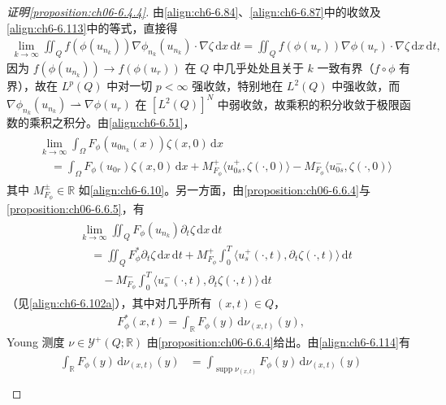 \documentclass[../../main.tex]{subfiles}%
\begin{document}
\begin{proof}[证明\cref{proposition:ch06-6.4.4}]
由\eqref{align:ch6-6.84}、\eqref{align:ch6-6.87}中的收敛及\eqref{align:ch6-6.113}中的等式，直接得
\begin{align}
\lim_{k\to\infty}\iint_Q f(\phi(u_{n_k}))\nabla\phi_{n_k}(u_{n_k})\cdot\nabla\zeta\,\mathrm{d}x\,\mathrm{d}t
=\iint_Q f(\phi(u_r))\nabla\phi(u_r)\cdot\nabla\zeta\,\mathrm{d}x\,\mathrm{d}t, \label{align:ch6-6.127}
\end{align}
因为 $f(\phi(u_{n_k}))\to f(\phi(u_r))$ 在 $Q$ 中几乎处处且关于 $k$ 一致有界（$f\circ\phi$ 有界），故在 $L^p(Q)$ 中对一切 $p<\infty$ 强收敛，特别地在 $L^2(Q)$ 中强收敛，而 $\nabla\phi_{n_k}(u_{n_k})\rightharpoonup\nabla\phi(u_r)$ 在 $[L^2(Q)]^N$ 中弱收敛，故乘积的积分收敛于极限函数的乘积之积分。由\eqref{align:ch6-6.51}，
\begin{align}
\begin{aligned}
&\lim_{k\to\infty}\int_\Omega F_\phi(u_{0n_k}(x))\zeta(x,0)\,\mathrm{d}x\\
&\quad=\int_\Omega F_\phi(u_{0r})\zeta(x,0)\,\mathrm{d}x
+M^+_{F_\phi}\langle u^+_{0s},\zeta(\cdot,0)\rangle
-M^-_{F_\phi}\langle u^-_{0s},\zeta(\cdot,0)\rangle
\end{aligned} 
\label{align:ch6-6.128}
\end{align}
其中 $M^\pm_{F_\phi}\in\mathbb{R}$ 如\eqref{align:ch6-6.10}。另一方面，由\cref{proposition:ch06-6.6.4}与\cref{proposition:ch06-6.6.5}，有
\begin{align}
\begin{aligned}
&\lim_{k\to\infty}\iint_Q F_\phi(u_{n_k})\partial_t\zeta\,\mathrm{d}x\,\mathrm{d}t\\
&\quad=\iint_Q F^*_\phi\partial_t\zeta\,\mathrm{d}x\,\mathrm{d}t
+M^+_{F_\phi}\int_0^T\langle u^+_s(\cdot,t),\partial_t\zeta(\cdot,t)\rangle\,\mathrm{d}t\\
&\qquad-M^-_{F_\phi}\int_0^T\langle u^-_s(\cdot,t),\partial_t\zeta(\cdot,t)\rangle\,\mathrm{d}t
\end{aligned} 
\label{align:ch6-6.129}
\end{align}
（见\eqref{align:ch6-6.102a}），其中对几乎所有 $(x,t)\in Q$，
\begin{align*}
F^*_\phi(x,t)=\int_\mathbb{R}F_\phi(y)\,\mathrm{d}\nu_{(x,t)}(y),
\end{align*}
Young 测度 $\nu\in\mathcal{Y}^+(Q;\mathbb{R})$ 由\cref{proposition:ch06-6.6.4}给出。由\eqref{align:ch6-6.114}有
\begin{align}
\begin{aligned}
\int_\mathbb{R}F_\phi(y)\,\mathrm{d}\nu_{(x,t)}(y)
&=\int_{\operatorname{supp}\nu_{(x,t)}}F_\phi(y)\,\mathrm{d}\nu_{(x,t)}(y)\\

\end{aligned}
\end{align}
\end{proof}
\end{document}

